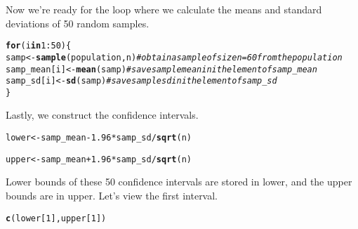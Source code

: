 \documentclass{article}\usepackage[]{graphicx}\usepackage[]{color}
\makeatletter
\newcommand{\hlnum}[1]{\textcolor[rgb]{0.686,0.059,0.569}{#1}}%
\newcommand{\hlcom}[1]{\textcolor[rgb]{0.678,0.584,0.686}{\textit{#1}}}%
\newcommand{\hlopt}[1]{\textcolor[rgb]{0,0,0}{#1}}%
\newcommand{\hlstd}[1]{\textcolor[rgb]{0.345,0.345,0.345}{#1}}%
\newcommand{\hlkwa}[1]{\textcolor[rgb]{0.161,0.373,0.58}{\textbf{#1}}}%
\newcommand{\hlkwb}[1]{\textcolor[rgb]{0.69,0.353,0.396}{#1}}%
\newcommand{\hlkwd}[1]{\textcolor[rgb]{0.737,0.353,0.396}{\textbf{#1}}}%
\newenvironment{kframe}{%
 \def\at@end@of@kframe{}%
 \ifinner\ifhmode%
  \def\at@end@of@kframe{\end{minipage}}%
  \begin{minipage}{\columnwidth}%
 \fi\fi%
 \def\FrameCommand##1{\hskip\@totalleftmargin \hskip-\fboxsep
 \colorbox{shadecolor}{##1}\hskip-\fboxsep
     \hskip-\linewidth \hskip-\@totalleftmargin \hskip\columnwidth}%
 \MakeFramed {\advance\hsize-\width
   \@totalleftmargin\z@ \linewidth\hsize
   \@setminipage}}%
 {\par\unskip\endMakeFramed%
 \at@end@of@kframe}
\newenvironment{knitrout}{}{} %
\makeatother
\begin{document}
Now we're ready for the loop where we calculate the means and standard deviations of 50 random samples.

\begin{knitrout}
\color{fgcolor}\begin{kframe}
\begin{alltt}
\hlkwa{for}\hlstd{(i} \hlkwa{in} \hlnum{1}\hlopt{:}\hlnum{50}\hlstd{)\{}
  \hlstd{samp} \hlkwb{<-} \hlkwd{sample}\hlstd{(population, n)} \hlcom{# obtain a sample of size n = 60 from the population}
  \hlstd{samp_mean[i]} \hlkwb{<-} \hlkwd{mean}\hlstd{(samp)}    \hlcom{# save sample mean in ith element of samp_mean}
  \hlstd{samp_sd[i]} \hlkwb{<-} \hlkwd{sd}\hlstd{(samp)}        \hlcom{# save sample sd in ith element of samp_sd}
\hlstd{\}}
\end{alltt}
\end{kframe}
\end{knitrout}


Lastly, we construct the confidence intervals.

\begin{knitrout}
\color{fgcolor}\begin{kframe}
\begin{alltt}
\hlstd{lower} \hlkwb{<-} \hlstd{samp_mean} \hlopt{-} \hlnum{1.96} \hlopt{*} \hlstd{samp_sd}\hlopt{/}\hlkwd{sqrt}\hlstd{(n)}

\hlstd{upper} \hlkwb{<-} \hlstd{samp_mean} \hlopt{+} \hlnum{1.96} \hlopt{*} \hlstd{samp_sd}\hlopt{/}\hlkwd{sqrt}\hlstd{(n)}
\end{alltt}
\end{kframe}
\end{knitrout}


Lower bounds of these 50 confidence intervals are stored in \hlnum{lower}, and the upper bounds are in \hlnum{upper}. Let's view the first interval.

\begin{knitrout}
\color{fgcolor}\begin{kframe}
\begin{alltt}
\hlkwd{c}\hlstd{(lower[}\hlnum{1}\hlstd{], upper[}\hlnum{1}\hlstd{])}
\end{alltt}
\end{kframe}
\end{knitrout}


\vspace{1.5cm}
\end{document}
